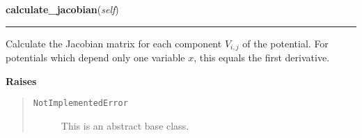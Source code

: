 \hspace{.8\funcindent}\begin{boxedminipage}{\funcwidth}

    \raggedright \textbf{calculate\_jacobian}(\textit{self})

    \vspace{-1.5ex}

    \rule{\textwidth}{0.5\fboxrule}
\setlength{\parskip}{2ex}
    Calculate the Jacobian matrix for each component $V_{i,j}$ of the
    potential. For potentials which depend only one variable $x$, this
    equals the first derivative.

\setlength{\parskip}{1ex}
      \textbf{Raises}
    \vspace{-1ex}

      \begin{quote}
        \begin{description}

          \item[\texttt{NotImplementedError}]

          This is an abstract base class.

        \end{description}

      \end{quote}

    \end{boxedminipage}

    \label{MatrixPotential:MatrixPotential:evaluate_jacobian_at}

    \vspace{0.5ex}

